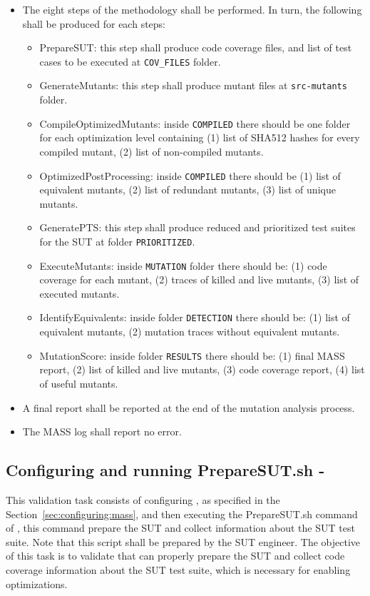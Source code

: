 \begin{itemize}
  \item The eight steps of the methodology shall be performed. In turn, the following shall be produced for each steps:
    \begin{itemize}
      \item PrepareSUT: this step shall produce code coverage files, and list of test cases to be executed at \texttt{COV\_FILES} folder.
      \item GenerateMutants: this step shall produce mutant files at \texttt{src-mutants} folder.
      \item CompileOptimizedMutants: inside \texttt{COMPILED} there should be one folder for each optimization level containing (1) list of SHA512 hashes for every compiled mutant, (2) list of non-compiled mutants.
      \item OptimizedPostProcessing: inside \texttt{COMPILED} there should be (1) list of equivalent mutants, (2) list of redundant mutants, (3) list of unique mutants.
      \item GeneratePTS: this step shall produce reduced and prioritized test suites for the SUT at folder \texttt{PRIORITIZED}.
      \item ExecuteMutants: inside \texttt{MUTATION} folder there should be: (1) code coverage for each mutant, (2) traces of killed and live mutants, (3) list of executed mutants.
      \item IdentifyEquivalents: inside folder \texttt{DETECTION} there should be: (1) list of equivalent mutants, (2) mutation traces without equivalent mutants.
      \item MutationScore: inside folder \texttt{RESULTS} there should be: (1) final MASS report, (2) list of killed and live mutants, (3) code coverage report, (4) list of useful mutants. 
    \end{itemize}
  \item A final report shall be reported at the end of the mutation analysis process.
  \item The MASS log shall report no error.
\end{itemize}

\subsection{Configuring \MASS and running PrepareSUT.sh - \MASS}

This validation task consists of configuring \MASS, as specified in the Section~\ref{sec:configuring:mass}, and then executing the PrepareSUT.sh command of \MASS, this command prepare the SUT and collect information about the SUT test suite. Note that this script shall be prepared by the SUT engineer. 
The objective of this task is to validate that \MASS can properly prepare the SUT and collect code coverage information about the SUT test suite, which is necessary for enabling \MASS optimizations.

